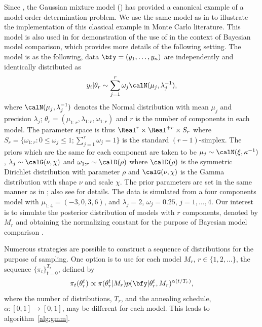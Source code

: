 \documentclass[11pt, fontset=Minion, showoverfull,
bib, mintcode, minted=cache]{marticle}
\begin{document}
Since \textcite{Richardson:1997ea}, the Gaussian mixture model (\gmm) has
provided a canonical example of a model-order-determination problem. We use
the same model as in \textcite{DelMoral:2006hc} to illustrate the
implementation of this classical example in Monte Carlo literature. This model
is also used in \textcite{Zhou2013mc} for demonstration of the use of \smc in
the context of Bayesian model comparison, which provides more details of the
following setting. The model is as the following, data $\bfy =
(y_1,\dots,y_n)$ are independently and identically distributed as
\begin{equation*}
  y_i|\theta_r \sim \sum_{j=1}^r \omega_j\calN(\mu_j,\lambda_j^{-1}),
\end{equation*}
where $\calN(\mu_j,\lambda_j^{-1})$ denotes the Normal distribution with mean
$\mu_j$ and precision $\lambda_j$; $\theta_r =
(\mu_{1:r},\lambda_{1:r},\omega_{1:r})$ and $r$ is the number of components in
each model. The parameter space is thus $\Real^r\times\Real^{+r}\times S_r$
where $S_r = \{\omega_{1:r}:0\le\omega_j\le1; \sum_{j=1}^r\omega_j=1\}$ is the
standard $(r-1)$-simplex. The priors which are the same for each component are
taken to be $\mu_j\sim\calN(\xi,\kappa^{-1})$, $\lambda_j\sim\calG(\nu,\chi)$
and $\omega_{1:r}\sim\calD(\rho)$ where $\calD(\rho)$ is the symmetric
Dirichlet distribution with parameter $\rho$ and $\calG(\nu,\chi)$ is the
Gamma distribution with shape $\nu$ and scale $\chi$. The prior parameters are
set in the same manner as in \textcite{Richardson:1997ea}; also see
\textcite{Zhou2013mc} for details. The data is simulated from a four
components model with $\mu_{1:4} = (-3, 0,3, 6)$, and $\lambda_j =2$,
$\omega_j = 0.25$, $j = 1,\dots,4$. Our interest is to simulate the posterior
distribution of models with $r$ components, denoted by $M_r$ and obtaining the
normalizing constant for the purpose of Bayesian model comparison
\textcite[chap.~7]{Robert:2007tc}.

Numerous strategies are possible to construct a sequence of distributions for
the purpose of \smc sampling. One option is to use for each model $M_r$,
$r\in\{1,2,\dots\}$, the sequence $\{\pi_t\}_{t=0}^{T_r}$, defined by
\begin{equation}
  \pi_t(\theta_r^t) \propto
  \pi(\theta_r^t|M_r)p(\bfy|\theta_r^t,M_r)^{\alpha(t/T_r)},
  \label{eq:geometry}
\end{equation}
where the number of distributions, $T_r$, and the annealing schedule,
$\alpha:[0,1]\to[0,1]$, may be different for each model. This leads to
algorithm~\ref{alg:gmm}.
\end{document}
